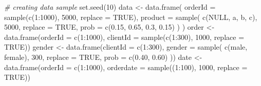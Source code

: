 \documentclass[
]{book}
\newenvironment{Shaded}{\begin{snugshade}}{\end{snugshade}}
\newcommand{\AttributeTok}[1]{\textcolor[rgb]{0.77,0.63,0.00}{#1}}
\newcommand{\CommentTok}[1]{\textcolor[rgb]{0.56,0.35,0.01}{\textit{#1}}}
\newcommand{\ConstantTok}[1]{\textcolor[rgb]{0.00,0.00,0.00}{#1}}
\newcommand{\DecValTok}[1]{\textcolor[rgb]{0.00,0.00,0.81}{#1}}
\newcommand{\FloatTok}[1]{\textcolor[rgb]{0.00,0.00,0.81}{#1}}
\newcommand{\FunctionTok}[1]{\textcolor[rgb]{0.00,0.00,0.00}{#1}}
\newcommand{\NormalTok}[1]{#1}
\newcommand{\OtherTok}[1]{\textcolor[rgb]{0.56,0.35,0.01}{#1}}
\newcommand{\SpecialCharTok}[1]{\textcolor[rgb]{0.00,0.00,0.00}{#1}}
\newcommand{\StringTok}[1]{\textcolor[rgb]{0.31,0.60,0.02}{#1}}
\begin{document}
\begin{Shaded}
\begin{Highlighting}[]
\CommentTok{\# creating data sample}
\FunctionTok{set.seed}\NormalTok{(}\DecValTok{10}\NormalTok{)}
\NormalTok{data }\OtherTok{\textless{}{-}} \FunctionTok{data.frame}\NormalTok{(}
    \AttributeTok{orderId =} \FunctionTok{sample}\NormalTok{(}\FunctionTok{c}\NormalTok{(}\DecValTok{1}\SpecialCharTok{:}\DecValTok{1000}\NormalTok{), }\DecValTok{5000}\NormalTok{, }\AttributeTok{replace =} \ConstantTok{TRUE}\NormalTok{),}
    \AttributeTok{product =} \FunctionTok{sample}\NormalTok{(}
        \FunctionTok{c}\NormalTok{(}\StringTok{\textquotesingle{}NULL\textquotesingle{}}\NormalTok{, }\StringTok{\textquotesingle{}a\textquotesingle{}}\NormalTok{, }\StringTok{\textquotesingle{}b\textquotesingle{}}\NormalTok{, }\StringTok{\textquotesingle{}c\textquotesingle{}}\NormalTok{),}
        \DecValTok{5000}\NormalTok{,}
        \AttributeTok{replace =} \ConstantTok{TRUE}\NormalTok{,}
        \AttributeTok{prob =} \FunctionTok{c}\NormalTok{(}\FloatTok{0.15}\NormalTok{, }\FloatTok{0.65}\NormalTok{, }\FloatTok{0.3}\NormalTok{, }\FloatTok{0.15}\NormalTok{)}
\NormalTok{    )}
\NormalTok{)}
\NormalTok{order }\OtherTok{\textless{}{-}} \FunctionTok{data.frame}\NormalTok{(}\AttributeTok{orderId =} \FunctionTok{c}\NormalTok{(}\DecValTok{1}\SpecialCharTok{:}\DecValTok{1000}\NormalTok{),}
                    \AttributeTok{clientId =} \FunctionTok{sample}\NormalTok{(}\FunctionTok{c}\NormalTok{(}\DecValTok{1}\SpecialCharTok{:}\DecValTok{300}\NormalTok{), }\DecValTok{1000}\NormalTok{, }\AttributeTok{replace =} \ConstantTok{TRUE}\NormalTok{))}
\NormalTok{gender }\OtherTok{\textless{}{-}} \FunctionTok{data.frame}\NormalTok{(}\AttributeTok{clientId =} \FunctionTok{c}\NormalTok{(}\DecValTok{1}\SpecialCharTok{:}\DecValTok{300}\NormalTok{),}
                     \AttributeTok{gender =} \FunctionTok{sample}\NormalTok{(}
                         \FunctionTok{c}\NormalTok{(}\StringTok{\textquotesingle{}male\textquotesingle{}}\NormalTok{, }\StringTok{\textquotesingle{}female\textquotesingle{}}\NormalTok{),}
                         \DecValTok{300}\NormalTok{,}
                         \AttributeTok{replace =} \ConstantTok{TRUE}\NormalTok{,}
                         \AttributeTok{prob =} \FunctionTok{c}\NormalTok{(}\FloatTok{0.40}\NormalTok{, }\FloatTok{0.60}\NormalTok{)}
\NormalTok{                     ))}
\NormalTok{date }\OtherTok{\textless{}{-}} \FunctionTok{data.frame}\NormalTok{(}\AttributeTok{orderId =} \FunctionTok{c}\NormalTok{(}\DecValTok{1}\SpecialCharTok{:}\DecValTok{1000}\NormalTok{),}
                   \AttributeTok{orderdate =} \FunctionTok{sample}\NormalTok{((}\DecValTok{1}\SpecialCharTok{:}\DecValTok{100}\NormalTok{), }\DecValTok{1000}\NormalTok{, }\AttributeTok{replace =} \ConstantTok{TRUE}\NormalTok{))}

\end{Highlighting}
\end{Shaded}
\end{document}
